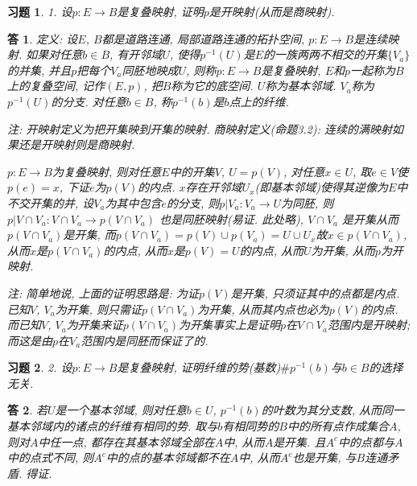 \documentclass{ctexart}%
\newtheorem*{exercise}{习题}
\newtheorem*{solution}{答}
\theoremstyle{definition}
\theoremstyle{remark}
\begin{document}
\begin{exercise}1. 设$p:E\rightarrow B$是复叠映射, 证明$p$是开映射(从而是商映射).
\end{exercise}
\begin{solution}
定义: 设$E$, $B$都是道路连通, 局部道路连通的拓扑空间, $p:E\rightarrow B$是连续映射. 如果对任意$b\in B$, 有开邻域$U$, 使得$p^{-1}(U)$是$E$的一族两两不相交的开集$\{V_a\}$的并集, 并且$p$把每个$V_a$同胚地映成$U$, 则称$p:E\rightarrow B$是复叠映射, $E$和$p$一起称为$B$上的复叠空间, 记作$(E,p)$, 把$B$称为它的底空间. $U$称为基本邻域. $V_a$称为$p^{-1}(U)$的分支. 对任意$b\in B$, 称$p^{-1}(b)$是$b$点上的纤维. 

注: 开映射定义为把开集映到开集的映射. 商映射定义(命题3.2): 连续的满映射如果还是开映射则是商映射.

$p:E\rightarrow B$为复叠映射, 则对任意$E$中的开集$V$, $U=p(V)$, 对任意$x\in U$, 取$e\in V$使$p(e)=x$, 下证$e$为$p(V)$的内点. $x$存在开邻域$U_x$(即基本邻域)使得其逆像为$E$中不交开集的并, 设$V_a$为其中包含$e$的分支, 则$p|V_a:V_a\rightarrow U$为同胚, 则$p|V\cap V_a:V\cap V_a\rightarrow p(V\cap V_a)$ 也是同胚映射(易证. 此处略), $V\cap V_a$ 是开集从而$p(V\cap V_a)$是开集, 而$p(V\cap V_a)=p(V)\cup p(V_a)=U\cup U_x$故$x\in p(V\cap V_a)$, 从而$x$是$p(V\cap V_a)$的内点, 从而$x$是$p(V)=U$的内点, 从而$U$为开集, 从而$p$为开映射. 

注: 简单地说, 上面的证明思路是: 为证$p(V)$是开集, 只须证其中的点都是内点. 已知$V$, $V_a$为开集, 则只需证$p(V\cap V_a)$为开集, 从而其内点也必为$p(V)$的内点. 而已知$V$, $V_a$为开集来证$p(V\cap V_a)$为开集事实上是证明$p$在$V\cap V_a$范围内是开映射; 而这是由$p$在$V_a$范围内是同胚而保证了的. 
\end{solution}

\begin{exercise}2. 设$p:E\rightarrow B$是复叠映射, 证明纤维的势(基数)$\# p^{-1}(b)$与$b\in B$的选择无关.
\end{exercise}
\begin{solution}
若$U$是一个基本邻域, 则对任意$b\in U$, $p^{-1}(b)$的叶数为其分支数, 从而同一基本邻域内的诸点的纤维有相同的势. 取与$b$有相同势的$B$中的所有点作成集合$A$, 则对$A$中任一点, 都存在其基本邻域全部在$A$中, 从而$A$是开集. 且$A^c$中的点都与$A$中的点式不同, 则$A^c$中的点的基本邻域都不在$A$中, 从而$A^c$也是开集, 与$B$连通矛盾. 得证.
\end{solution}
\end{document}
